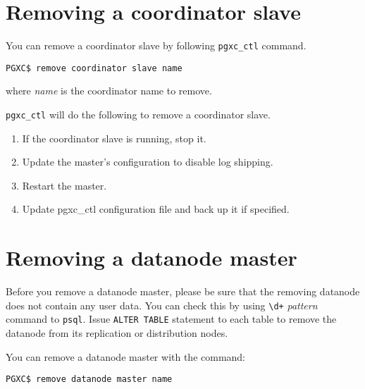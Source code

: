 
\section{\label{pgxcCtl:removeCoordSlave}Removing a coordinator slave}

  You can remove a coordinator slave by following \verb|pgxc_ctl| command.
  
  \begin{lstlisting}[frame=single]
PGXC$ remove coordinator slave name
  \end{lstlisting}
  
  where {\it name} is the coordinator name to remove.
  
  \verb|pgxc_ctl| will do the following to remove a coordinator slave.
  
  \begin{enumerate}
	  \item If the coordinator slave is running, stop it.
	  \item Update the master's configuration to disable log shipping.
	  \item Restart the master.
	  \item Update pgxc\_ctl configuration file and back up it if specified.
  \end{enumerate}



\section{Removing a datanode master}

  Before you remove a datanode master, please be sure that the removing datanode does not
  contain any user data.
  You can check this by using \verb|\d+| {\it pattern} command to \verb|psql|.
  Issue \verb|ALTER TABLE| statement to each table to remove the datanode from its
  replication or distribution nodes.
  
  You can remove a datanode master with the command:
  
  \begin{lstlisting}[frame=single]
PGXC$ remove datanode master name
  \end{lstlisting}
  

